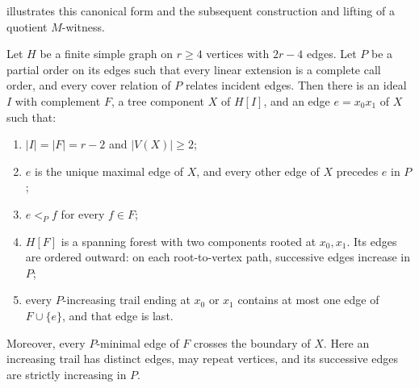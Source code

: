 \documentclass[USenglish, a4paper, thm-restate,numberwithinsect, cleveref]{lipics-v2021}
\begin{document}
 illustrates this canonical form and the
subsequent construction and lifting of a quotient $M$-witness.

\begin{lemma}\label{lem:characterization-canonical-ideal}
Let $H$ be a finite simple graph on $r\ge4$ vertices with $2r-4$
edges. Let $P$ be a partial order on its edges such that every linear
extension is a complete call order, and every cover relation of $P$
relates incident edges. Then there is an ideal $I$ with complement $F$,
a tree component $X$ of $H[I]$, and an edge $e=x_0x_1$ of $X$ such that:
\begin{enumerate}
\item $|I|=|F|=r-2$ and $|V(X)|\ge2$;
\item $e$ is the unique maximal edge of $X$, and every other edge of
 $X$ precedes $e$ in $P$;
\item $e<_P f$ for every $f\in F$;
\item $H[F]$ is a spanning forest with two components rooted at
 $x_0,x_1$. Its edges are ordered outward: on each root-to-vertex path,
 successive edges increase in $P$;
\item every $P$-increasing trail ending at $x_0$ or $x_1$ contains at
 most one edge of $F\cup\{e\}$, and that edge is last.
\end{enumerate}
Moreover, every $P$-minimal edge of $F$ crosses the boundary of $X$.
Here an increasing trail has distinct edges, may repeat vertices, and
its successive edges are strictly increasing in $P$.
\end{lemma}
\end{document}
